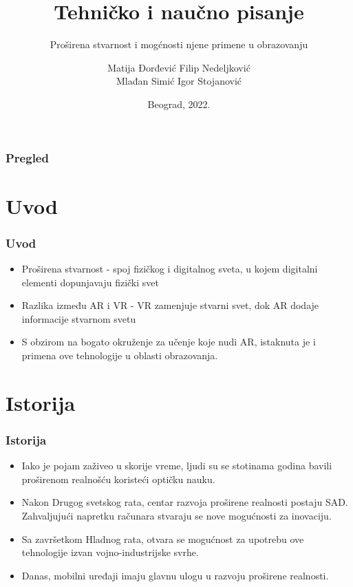 \documentclass[9pt]{beamer}
\title{Tehničko i naučno pisanje}
\subtitle{Proširena stvarnost i mogćnosti njene primene u obrazovanju}
\author{Matija Đorđević  Filip Nedeljković\\
Mlađan Simić  Igor Stojanović}
\institute{Matematički fakultet\\Univerzitet u Beogradu}
\date{
	\footnotesize{Beograd, 2022.}	
}
\begin{document}
\begin{frame}
	\thispagestyle{empty}
	\titlepage
\end{frame}

\addtocounter{framenumber}{-1}







\begin{frame}
	\frametitle{Pregled} %
	\tableofcontents[hidesubsections] 
\end{frame}

\section{Uvod}

\begin{frame}[fragile]\frametitle{Uvod}
	\begin{itemize}	
 \setlength\itemsep{1.5em}
		\item Proširena stvarnost - spoj fizičkog i digitalnog sveta, u kojem digitalni elementi dopunjavaju fizički svet
		\item Razlika između AR i VR - VR zamenjuje stvarni svet, dok AR dodaje informacije stvarnom svetu
		\item S obzirom na bogato okruženje za učenje koje nudi AR, istaknuta je i primena ove tehnologije u oblasti obrazovanja.
	
	\end{itemize}
\end{frame}


\section{Istorija}
	\begin{frame}
    \frametitle{Istorija}
        \begin{itemize}
            \setlength\itemsep{1.5em}
            \item Iako je pojam zaživeo u skorije vreme, ljudi su se stotinama godina bavili proširenom realnošću koristeći optičku nauku.
            \item Nakon Drugog svetskog rata, centar razvoja proširene realnosti postaju SAD. Zahvaljujući napretku računara stvaraju se nove mogućnosti za inovaciju.
            \item Sa završetkom Hladnog rata, otvara se mogućnost za upotrebu ove tehnologije izvan vojno-industrijske svrhe.
            \item Danas, mobilni uređaji imaju glavnu ulogu u razvoju proširene realnosti.
		\end{itemize}
	\end{frame}
	
\end{document}
